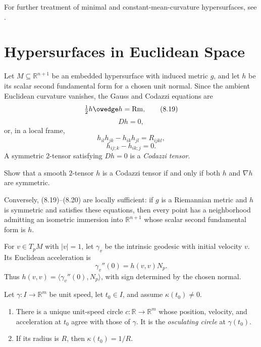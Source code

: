 For further treatment of minimal and constant-mean-curvature hypersurfaces,
see \cite{CM11}.
\section{Hypersurfaces in Euclidean Space}

Let $M\subseteq\mathbb R^{n+1}$ be an embedded hypersurface with induced
metric $g$, and let $h$ be its scalar second fundamental form for a chosen unit
normal.  Since the ambient Euclidean curvature vanishes, the Gauss and Codazzi
equations are
\begin{equation}
\tfrac12h\owedge h=\mathrm{Rm}, \tag{8.19}
\end{equation}
\begin{equation}
Dh=0, \tag{8.20}
\end{equation}
or, in a local frame,
\begin{equation}
h_{il}h_{jk}-h_{ik}h_{jl}=R_{ijkl}, \tag{8.21}
\end{equation}
\begin{equation}
h_{ij;k}-h_{ik;j}=0. \tag{8.22}
\end{equation}
A symmetric $2$-tensor satisfying $Dh=0$ is a \emph{Codazzi tensor}.

\begin{exercise}
\label{exer:codazzi-tensor-characterization}
Show that a smooth $2$-tensor $h$ is a Codazzi tensor if and only if both $h$
and $\nabla h$ are symmetric.
\end{exercise}

Conversely, (8.19)--(8.20) are locally sufficient: if $g$ is a Riemannian
metric and $h$ is symmetric and satisfies these equations, then every point
has a neighborhood admitting an isometric immersion into $\mathbb R^{n+1}$
whose scalar second fundamental form is $h$.

For $v\in T_pM$ with $|v|=1$, let $\gamma_v$ be the intrinsic geodesic with
initial velocity $v$.  Its Euclidean acceleration is
\[
\gamma_v''(0)=h(v,v)N_p.
\]
Thus $h(v,v)=\langle\gamma_v''(0),N_p\rangle$, with sign determined by the
chosen normal.

\begin{proposition}
\label{prop:osculating-circle}
Let $\gamma:I\to\mathbb R^m$ be unit speed, let $t_0\in I$, and assume
$\kappa(t_0)\ne0$.
\begin{enumerate}
\item[(a)] There is a unique unit-speed circle
$c:\mathbb R\to\mathbb R^m$ whose position, velocity, and acceleration at
$t_0$ agree with those of $\gamma$.  It is the \emph{osculating circle} at
$\gamma(t_0)$.
\item[(b)] If its radius is $R$, then $\kappa(t_0)=1/R$.
\end{enumerate}
\end{proposition}

